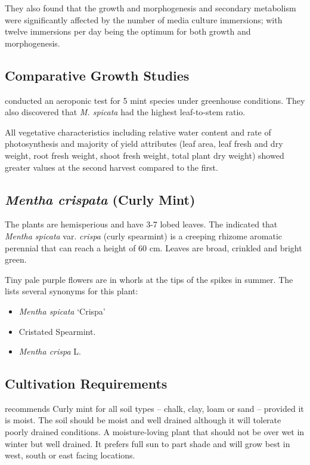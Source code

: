 They also found that the growth and morphogenesis and secondary metabolism were significantly affected by the number of media culture immersions; with twelve immersions per day being the optimum for both growth and morphogenesis.

\subsection*{Comparative Growth Studies}

\textcite{yaghobvand2022evaluation} conducted an aeroponic test for 5 mint species under greenhouse conditions. They also discovered that \textit{M. spicata} had the highest leaf-to-stem ratio.

All vegetative characteristics including relative water content and rate of photosynthesis and majority of yield attributes (leaf area, leaf fresh and dry weight, root fresh weight, shoot fresh weight, total plant dry weight) showed greater values at the second harvest compared to the first.

\subsection{\textit{Mentha crispata} (Curly Mint)}

The plants are hemisperious and have 3-7 lobed leaves. The \textcite{rhs2026crispa} indicated that \textit{Mentha spicata} var. \textit{crispa} (curly spearmint) is a creeping rhizome aromatic perennial that can reach a height of 60 cm. Leaves are broad, crinkled and bright green.

Tiny pale purple flowers are in whorls at the tips of the spikes in summer. The \textcite{rhs2026crispa} lists several synonyms for this plant:
\begin{itemize}
    \item \textit{Mentha spicata} `Crispa'
    \item Cristated Spearmint.
    \item \textit{Mentha crispa} L.
\end{itemize}

\subsection*{Cultivation Requirements}

\textcite{rhs2026crispa} recommends Curly mint for all soil types – chalk, clay, loam or sand – provided it is moist. The soil should be moist and well drained although it will tolerate poorly drained conditions. A moisture-loving plant that should not be over wet in winter but well drained. It prefers full sun to part shade and will grow best in west, south or east facing locations.

